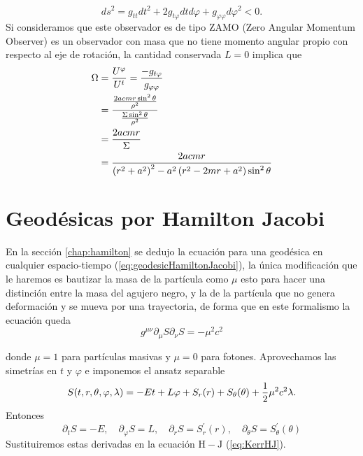 \begin{equation}
    d s^2=g_{t t}dt^2+2 g_{t \varphi} dtd\varphi+g_{\varphi \varphi}d\varphi^2<0.
\end{equation}
Si consideramos que este observador es de tipo ZAMO  (Zero Angular Momentum Observer) es un observador con masa que no tiene momento angular propio con respecto al eje de rotación, la cantidad conservada $L=0$ implica que
\begin{equation}
    \begin{aligned}
        \Omega & =\frac{U^{\varphi}}{U^t} = \frac{ - g_{t \varphi}}{g_{\varphi \varphi}}                \\
               & = \frac{ \frac{2a c mr \sin^2\theta}{\rho^2}}{\frac{\Sigma \sin^2\theta}{\rho^2}}      \\
               & = \frac{2a c mr}{\Sigma}                                                               \\
               & = \frac{2a c m r}{\left(r^2+a^2\right)^2-a^2\left(r^2-2 m r+a^2\right) \sin ^2 \theta}
    \end{aligned}
\end{equation}

\section{Geodésicas por Hamilton Jacobi}
En la sección \ref{chap:hamilton} se dedujo la ecuación para una geodésica en cualquier espacio-tiempo (\ref{eq:geodesicHamiltonJacobi}), la única modificación que le haremos es bautizar la masa de la partícula como $\mu$ esto para hacer una distinción  entre la masa del agujero negro, y la de la partícula que no genera deformación y se mueva por una trayectoria, de forma que en este formalismo la ecuación queda
\begin{equation}
    g^{\mu \nu} \partial_\mu S \partial_\nu S=-\mu^2c^2
    \label{eq:KerrHJ}
\end{equation}

donde $\mu=1$ para partículas masivas y $\mu=0$ para fotones.
Aprovechamos las simetrías en $t$ y $\varphi$ e imponemos el ansatz separable
\begin{equation}
    S(t, r, \theta, \varphi, \lambda)=-E t+L \varphi+S_r(r)+S_\theta(\theta)+\frac{1}{2} \mu^2 c^2\lambda.
\end{equation}
Entonces
\begin{equation}
    \partial_t S=-E, \quad \partial_{\varphi} S=L, \quad \partial_r S=S_r^{\prime}(r), \quad \partial_\theta S=S_\theta^{\prime}(\theta)
\end{equation}
Sustituiremos estas derivadas en la ecuación $\mathrm{H}-\mathrm{J}$ (\ref{eq:KerrHJ}).


